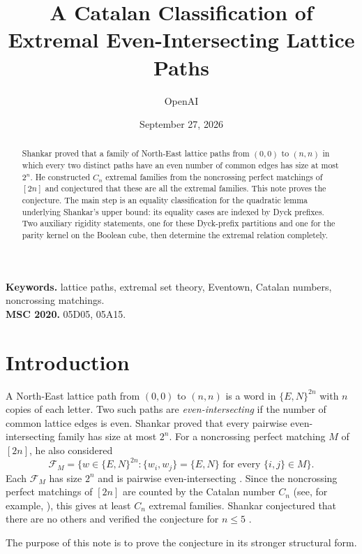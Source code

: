 \documentclass[11pt]{article}
\title{A Catalan Classification of Extremal Even-Intersecting Lattice Paths}
\author{OpenAI}
\date{September 27, 2026}
\theoremstyle{definition}
\begin{document}
\maketitle

\begin{abstract}
Shankar proved that a family of North-East lattice paths from $(0,0)$ to $(n,n)$ in which every two distinct paths have an even number of common edges has size at most $2^n$.  He constructed $C_n$ extremal families from the noncrossing perfect matchings of $[2n]$ and conjectured that these are all the extremal families.  This note proves the conjecture.  The main step is an equality classification for the quadratic lemma underlying Shankar's upper bound: its equality cases are indexed by Dyck prefixes.  Two auxiliary rigidity statements, one for these Dyck-prefix partitions and one for the parity kernel on the Boolean cube, then determine the extremal relation completely.
\end{abstract}

\noindent\textbf{Keywords.} lattice paths, extremal set theory, Eventown, Catalan numbers, noncrossing matchings.\\
\textbf{MSC 2020.} 05D05, 05A15.

\section{Introduction}

A North-East lattice path from $(0,0)$ to $(n,n)$ is a word in $\{E,N\}^{2n}$ with $n$ copies of each letter.  Two such paths are \emph{even-intersecting} if the number of common lattice edges is even.  Shankar \cite{Shankar} proved that every pairwise even-intersecting family has size at most $2^n$.  For a noncrossing perfect matching $M$ of $[2n]$, he also considered
\begin{equation}\label{eq:FM}
 \mathcal F_M=
 \bigl\{w\in\{E,N\}^{2n}:\{w_i,w_j\}=\{E,N\}
        \text{ for every }\{i,j\}\in M\bigr\}.
\end{equation}
Each $\mathcal F_M$ has size $2^n$ and is pairwise even-intersecting \cite[Section~4]{Shankar}.  Since the noncrossing perfect matchings of $[2n]$ are counted by the Catalan number $C_n$ (see, for example, \cite{Stanley}), this gives at least $C_n$ extremal families.  Shankar conjectured that there are no others \cite[Conjecture~4.1]{Shankar} and verified the conjecture for $n\le5$ \cite[Section~4]{Shankar}.

The purpose of this note is to prove the conjecture in its stronger structural form.
\end{document}
